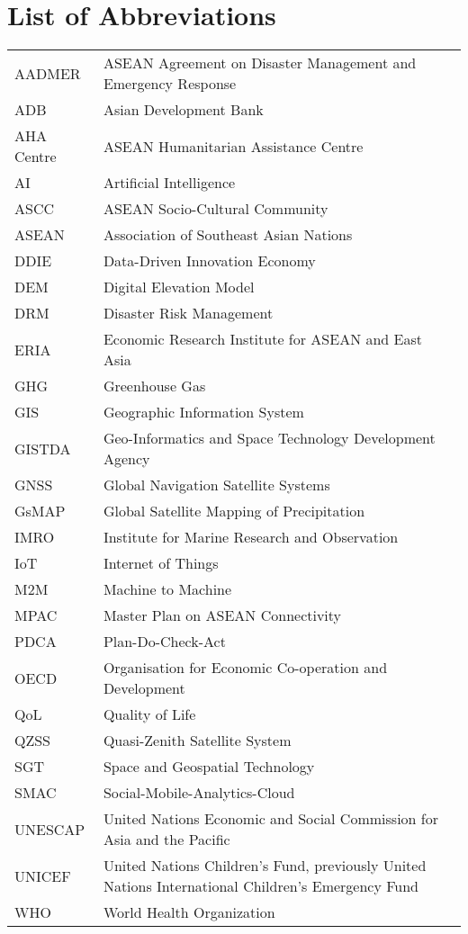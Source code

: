 \chapter*{List of Abbreviations}

\begin{longtable}{lp{12cm}}
\centering

{AADMER} & {ASEAN Agreement on Disaster Management and Emergency Response} \\
{ADB} & {Asian Development Bank} \\
{AHA Centre} & {ASEAN Humanitarian Assistance Centre} \\
{AI} & {Artificial Intelligence} \\
{ASCC} & {ASEAN Socio-Cultural Community} \\
{ASEAN} & {Association of Southeast Asian Nations} \\
{DDIE} & {Data-Driven Innovation Economy} \\
{DEM} & {Digital Elevation Model} \\
{DRM} & {Disaster Risk Management} \\
{ERIA} & {Economic Research Institute for ASEAN and East Asia} \\
{GHG} & {Greenhouse Gas} \\
{GIS} & {Geographic Information System} \\
{GISTDA} & {Geo-Informatics and Space Technology Development Agency} \\
{GNSS} & {Global Navigation Satellite Systems} \\
{GsMAP} & {Global Satellite Mapping of Precipitation} \\
{IMRO} & {Institute for Marine Research and Observation} \\
{IoT} & {Internet of Things} \\
{M2M} & {Machine to Machine} \\
{MPAC} & {Master Plan on ASEAN Connectivity} \\
{PDCA} & {Plan-Do-Check-Act} \\
{OECD} & {Organisation for Economic Co-operation and Development} \\
{QoL} & {Quality of Life} \\
{QZSS} & {Quasi-Zenith Satellite System} \\
{SGT} & {Space and Geospatial Technology} \\
{SMAC} & {Social-Mobile-Analytics-Cloud} \\
{UNESCAP} & {United Nations Economic and Social Commission for Asia and the Pacific} \\
{UNICEF} & {United Nations Children's Fund, previously United Nations International Children's Emergency Fund} \\
{WHO} & {World Health Organization} \\

\end{longtable}